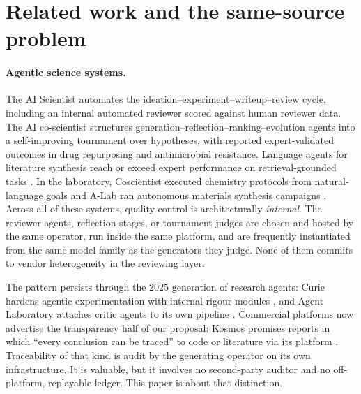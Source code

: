 \documentclass[11pt,letterpaper]{article}
\begin{document}
\section{Related work and the same-source problem}\label{sec:related}

\paragraph{Agentic science systems.} The AI Scientist \cite{lu2024aiscientist,yamada2025aisv2,lu2026nature} automates the ideation--experiment--writeup--review cycle, including an internal automated reviewer scored against human reviewer data. The AI co-scientist \cite{gottweis2025coscientist} structures generation--reflection--ranking--evolution agents into a self-improving tournament over hypotheses, with reported expert-validated outcomes in drug repurposing and antimicrobial resistance. Language agents for literature synthesis reach or exceed expert performance on retrieval-grounded tasks \cite{skarlinski2024}.  In the laboratory, Coscientist executed chemistry protocols from natural-language goals \cite{boiko2023} and A-Lab ran autonomous materials synthesis campaigns \cite{szymanski2023}. Across all of these systems, quality control is architecturally \emph{internal}. The reviewer agents, reflection stages, or tournament judges are chosen and hosted by the same operator, run inside the same platform, and are frequently instantiated from the same model family as the generators they judge. None of them commits to vendor heterogeneity in the reviewing layer.

The pattern persists through the 2025 generation of research agents: Curie hardens agentic experimentation with internal rigour modules \cite{kon2025curie}, and Agent Laboratory attaches critic agents to its own pipeline \cite{schmidgall2025agentlab}. Commercial platforms now advertise the transparency half of our proposal: Kosmos promises reports in which ``every conclusion can be traced'' to code or literature via its platform \cite{edison2025kosmos}. Traceability of that kind is audit by the generating operator on its own infrastructure. It is valuable, but it involves no second-party auditor and no off-platform, replayable ledger. This paper is about that distinction.
\end{document}
